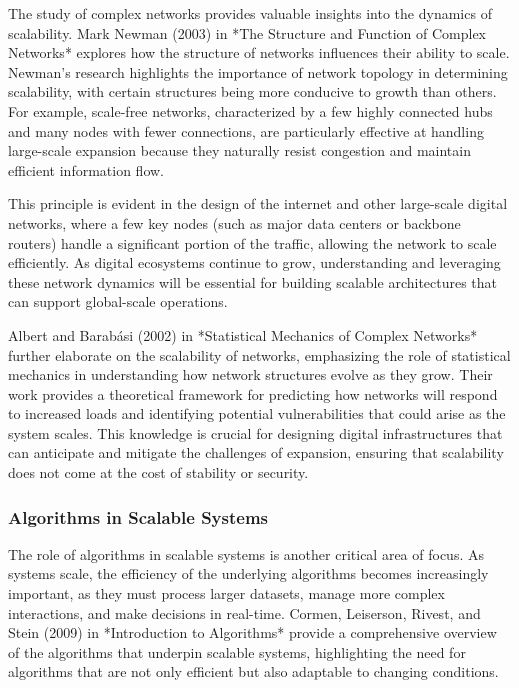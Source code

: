 \documentclass[12pt,twoside]{article}
\begin{document}
The study of complex networks provides valuable insights into the dynamics of scalability. Mark Newman (2003) in *The Structure and Function of Complex Networks* explores how the structure of networks influences their ability to scale. Newman’s research highlights the importance of network topology in determining scalability, with certain structures being more conducive to growth than others. For example, scale-free networks, characterized by a few highly connected hubs and many nodes with fewer connections, are particularly effective at handling large-scale expansion because they naturally resist congestion and maintain efficient information flow.

This principle is evident in the design of the internet and other large-scale digital networks, where a few key nodes (such as major data centers or backbone routers) handle a significant portion of the traffic, allowing the network to scale efficiently. As digital ecosystems continue to grow, understanding and leveraging these network dynamics will be essential for building scalable architectures that can support global-scale operations.

Albert and Barabási (2002) in *Statistical Mechanics of Complex Networks* further elaborate on the scalability of networks, emphasizing the role of statistical mechanics in understanding how network structures evolve as they grow. Their work provides a theoretical framework for predicting how networks will respond to increased loads and identifying potential vulnerabilities that could arise as the system scales. This knowledge is crucial for designing digital infrastructures that can anticipate and mitigate the challenges of expansion, ensuring that scalability does not come at the cost of stability or security.


\subsubsection{Algorithms in Scalable Systems}

The role of algorithms in scalable systems is another critical area of focus. As systems scale, the efficiency of the underlying algorithms becomes increasingly important, as they must process larger datasets, manage more complex interactions, and make decisions in real-time. Cormen, Leiserson, Rivest, and Stein (2009) in *Introduction to Algorithms* provide a comprehensive overview of the algorithms that underpin scalable systems, highlighting the need for algorithms that are not only efficient but also adaptable to changing conditions.
\end{document}
